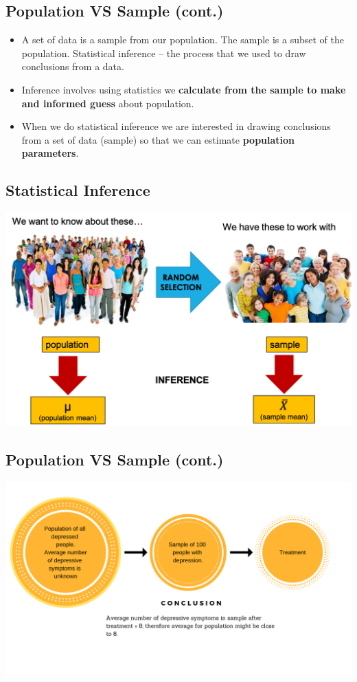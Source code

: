 \documentclass[]{article}
\providecommand{\tightlist}{%
  \setlength{\itemsep}{0pt}\setlength{\parskip}{0pt}}
\begin{document}
\hypertarget{population-vs-sample-cont.}{%
\subsection{Population VS Sample
(cont.)}\label{population-vs-sample-cont.}}

\begin{itemize}
\tightlist
\item
  A set of data is a sample from our population. The sample is a subset
  of the population. Statistical inference -- the process that we used
  to draw conclusions from a data.
\item
  Inference involves using statistics we {\textbf{calculate from the
  sample to make and informed guess}} about population.
\item
  When we do statistical inference we are interested in drawing
  conclusions from a set of data (sample) so that we can estimate
  {\textbf{population parameters}}.
\end{itemize}

\hypertarget{statistical-inference}{%
\subsection{Statistical Inference}\label{statistical-inference}}

\includegraphics[width=0.8\linewidth]{figure/Ch1-SnP}

\hypertarget{population-vs-sample-cont.-1}{%
\subsection{Population VS Sample
(cont.)}\label{population-vs-sample-cont.-1}}

\includegraphics[width=1\linewidth]{figure/PopNSam}
\end{document}
